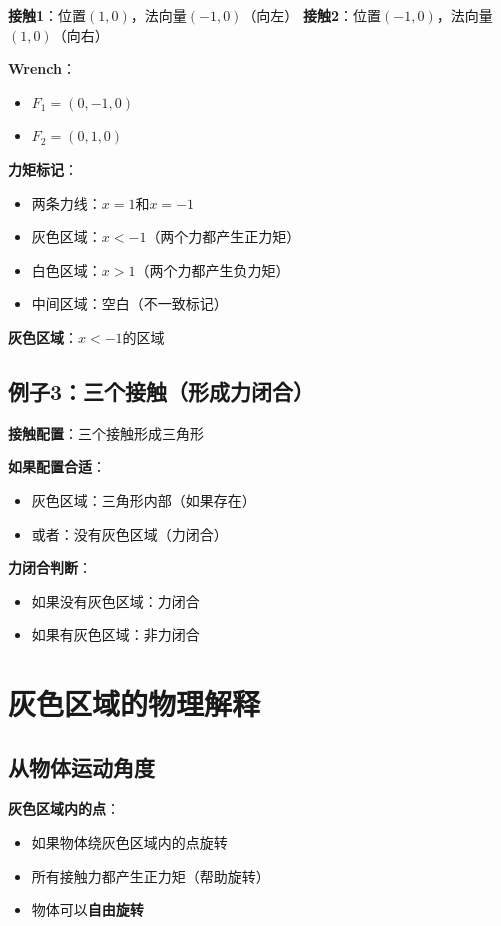 \documentclass[12pt,a4paper]{article}
\begin{document}
\textbf{接触1}：位置$(1, 0)$，法向量$(-1, 0)$（向左）
\textbf{接触2}：位置$(-1, 0)$，法向量$(1, 0)$（向右）

\textbf{Wrench}：
\begin{itemize}
\item $F_1 = (0, -1, 0)$
\item $F_2 = (0, 1, 0)$
\end{itemize}

\textbf{力矩标记}：
\begin{itemize}
\item 两条力线：$x = 1$和$x = -1$
\item 灰色区域：$x < -1$（两个力都产生正力矩）
\item 白色区域：$x > 1$（两个力都产生负力矩）
\item 中间区域：空白（不一致标记）
\end{itemize}

\textbf{灰色区域}：$x < -1$的区域

\subsection{例子3：三个接触（形成力闭合）}

\textbf{接触配置}：三个接触形成三角形

\textbf{如果配置合适}：
\begin{itemize}
\item 灰色区域：三角形内部（如果存在）
\item 或者：没有灰色区域（力闭合）
\end{itemize}

\textbf{力闭合判断}：
\begin{itemize}
\item 如果没有灰色区域：力闭合
\item 如果有灰色区域：非力闭合
\end{itemize}

\section{灰色区域的物理解释}

\subsection{从物体运动角度}

\textbf{灰色区域内的点}：
\begin{itemize}
\item 如果物体绕灰色区域内的点旋转
\item 所有接触力都产生正力矩（帮助旋转）
\item 物体可以\textbf{自由旋转}
\end{itemize}
\end{document}
